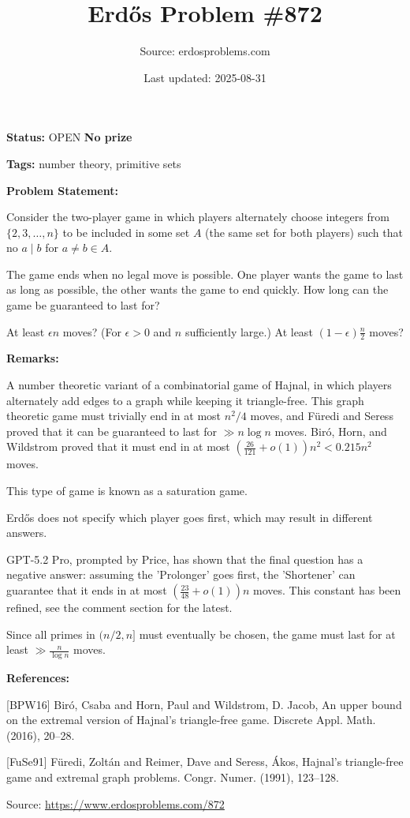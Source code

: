 \documentclass{article}
\title{Erd\H{o}s Problem \#872}
\date{Last updated: 2025-08-31}
\author{Source: erdosproblems.com}
\begin{document}
\maketitle

\noindent\textbf{Status:} OPEN \quad \textbf{No prize}

\noindent\textbf{Tags:} number theory, primitive sets

\medskip
\noindent\textbf{Problem Statement:}

Consider the two-player game in which players alternately choose integers from $\{2,3,\ldots,n\}$ to be included in some set $A$ (the same set for both players) such that no $a\mid b$ for $a\neq b\in A$. 

The game ends when no legal move is possible. One player wants the game to last as long as possible, the other wants the game to end quickly. How long can the game be guaranteed to last for? 

At least $\epsilon n$ moves? (For $\epsilon>0$ and $n$ sufficiently large.) At least $(1-\epsilon)\frac{n}{2}$ moves?

\bigskip
\noindent\textbf{Remarks:}

A number theoretic variant of a combinatorial game of Hajnal, in which players alternately add edges to a graph while keeping it triangle-free. This graph theoretic game must trivially end in at most $n^2/4$ moves, and F\"{u}redi and Seress \cite{FuSe91} proved that it can be guaranteed to last for $\gg n\log n$ moves. Bir\'{o}, Horn, and Wildstrom \cite{BPW16} proved that it must end in at most $(\frac{26}{121}+o(1))n^2<0.215n^2$ moves.

This type of game is known as a saturation game.

Erd\H{o}s does not specify which player goes first, which may result in different answers.

GPT-5.2 Pro, prompted by Price, has shown that the final question has a negative answer: assuming the 'Prolonger' goes first, the 'Shortener' can guarantee that it ends in at most $(\frac{23}{48}+o(1))n$ moves. This constant has been refined, see the comment section for the latest.

Since all primes in $(n/2,n]$ must eventually be chosen, the game must last for at least $\gg \frac{n}{\log n}$ moves.

\bigskip
\noindent\textbf{References:}

[BPW16] Bir\'{o}, Csaba and Horn, Paul and Wildstrom, D. Jacob, An upper bound on the extremal version of Hajnal's
triangle-free game. Discrete Appl. Math. (2016), 20--28.
 
 [FuSe91] F\"{u}redi, Zolt\'{a}n and Reimer, Dave and Seress, \'{A}kos, Hajnal's triangle-free game and extremal graph problems. Congr. Numer. (1991), 123--128.

\bigskip
\noindent\small{Source: \url{https://www.erdosproblems.com/872}}
\end{document}
